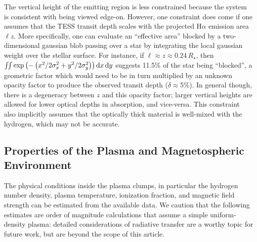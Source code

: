 \documentclass{nature3}
\begin{document}
\begin{methods}
The vertical height of the emitting region is less constrained because
the system is consistent with being viewed edge-on.  However, one
constraint does come if one assumes that the TESS transit depth scales
with the projected H$\alpha$ emission area $\ell z$.  
More specifically, one can evaluate an ``effective area'' blocked by a
two-dimensional gaussian blob passing over a star by integrating the
local gaussian weight over the stellar surface.  For instance, if
$\ell$$\approx$$z$$\approx$0.24\,$R_\star$, then
$\iint \exp \left(
  -\left( x^2/2\sigma_x^2 + y^2/2\sigma_y^2 \right)
\right) {\rm d}x \, {\rm d}y$
suggests 11.5\% of the star being ``blocked'', a geometric factor
which would need to be in turn multiplied by an unknown opacity factor
to produce the observed transit depth ($\delta$$\approx$5\%).  In
general though, there is a degeneracy between $z$ and this opacity
factor; larger vertical heights are allowed for lower optical depths
in absorption, and vice-versa.  This constraint also implicitly
assumes that the optically thick material is well-mixed with the
hydrogen, which may not be accurate.


\subsection{Properties of the Plasma and Magnetospheric Environment}\phantom{+}
\label{subsec:gas}

The physical conditions inside the plasma clumps, in particular the
hydrogen number density, plasma temperature, ionization fraction, and
magnetic field strength can be estimated from the available data.  We
caution that the following estimates are order of magnitude
calculations that assume a simple uniform-density plasma: detailed
considerations of radiative transfer are a worthy topic for future
work, but are beyond the scope of this article.


\end{methods}
\end{document}
